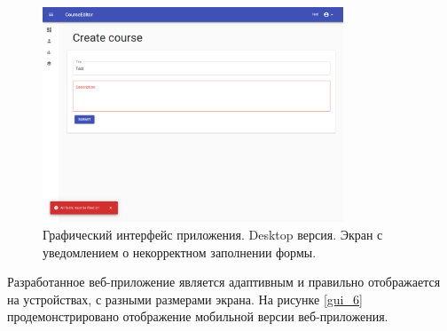 \documentclass[%
  a5paper,
  subf,
  href,
  master,
  dotsinheaders 
]{csse-fcs}
\begin{document}
\begin{figure}[H]
\includegraphics[width=0.8\textwidth]{img/9.png}
\captionsetup{justification=justified}
\caption{Графический интерфейс приложения. Desktop версия. Экран с уведомлением о некорректном заполнении формы.}
\label{gui_5}
\end{figure}

\newpage

Разработанное веб-приложение является адаптивным и правильно отображается на устройствах, с разными размерами экрана. На рисунке \ref{gui_6} продемонстрировано отображение мобильной версии веб-приложения.
\end{document}

